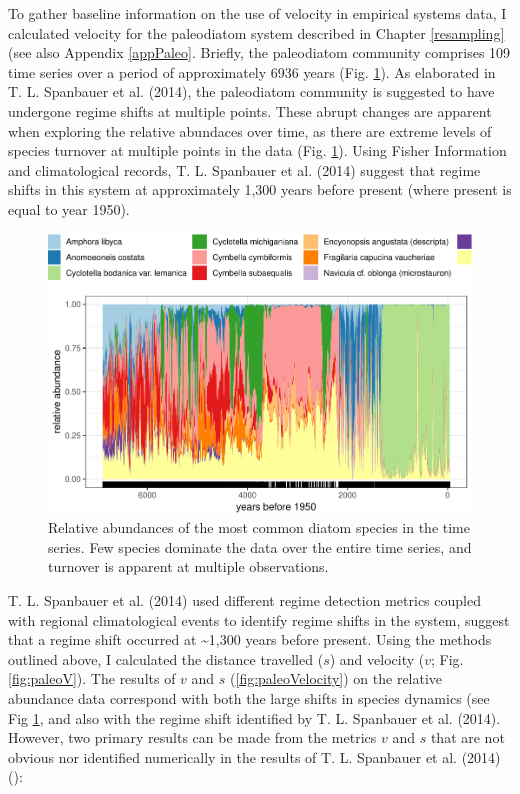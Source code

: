 \documentclass[12pt,twoside,openany]{reedthesis}
\begin{document}
To gather baseline information on the use of velocity in empirical
systems data, I calculated velocity for the paleodiatom system described
in Chapter \ref{resampling} (see also Appendix \ref{appPaleo}. Briefly,
the paleodiatom community comprises 109 time series over a period of
approximately 6936 years (Fig. \ref{fig:paleoTurnover}). As elaborated
in T. L. Spanbauer et al. (2014), the paleodiatom community is suggested
to have undergone regime shifts at multiple points. These abrupt changes
are apparent when exploring the relative abundaces over time, as there
are extreme levels of species turnover at multiple points in the data
(Fig. \ref{fig:paleoTurnover}). Using Fisher Information and
climatological records, T. L. Spanbauer et al. (2014) suggest that
regime shifts in this system at approximately 1,300 years before present
(where present is equal to year 1950).
\begin{figure}
\centering
\includegraphics{_myDissertation_files/figure-latex/paleoTurnover-1.pdf}
\caption{\label{fig:paleoTurnover}Relative abundances of the most common
diatom species in the time series. Few species dominate the data over
the entire time series, and turnover is apparent at multiple
observations.}
\end{figure}
T. L. Spanbauer et al. (2014) used different regime detection metrics
coupled with regional climatological events to identify regime shifts in
the system, suggest that a regime shift occurred at
\textasciitilde{}1,300 years before present. Using the methods outlined
above, I calculated the distance travelled (\(s\)) and velocity (\(v\);
Fig. \ref{fig:paleoV}). The results of \(v\) and \(s\)
(\ref{fig:paleoVelocity}) on the relative abundance data correspond with
both the large shifts in species dynamics (see Fig
\ref{fig:paleoTurnover}, and also with the regime shift identified by T.
L. Spanbauer et al. (2014). However, two primary results can be made
from the metrics \(v\) and \(s\) that are not obvious nor identified
numerically in the results of T. L. Spanbauer et al. (2014) ():
\end{document}
